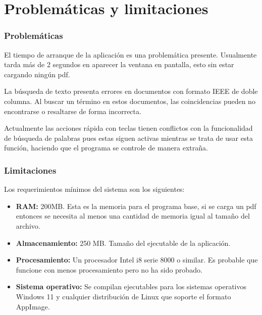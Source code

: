 \section{Problemáticas y limitaciones}

\subsubsection{Problemáticas}

El tiempo de arranque de la aplicación es una problemática presente. Usualmente tarda más de 2 segundos en aparecer la ventana en pantalla, esto sin estar cargando ningún pdf.

La búsqueda de texto presenta errores en documentos con formato IEEE de doble columna. Al buscar un término en estos documentos, las coincidencias pueden no encontrarse o resaltarse de forma incorrecta.

Actualmente las acciones rápida con teclas tienen conflictos con la funcionalidad de búsqueda de palabras pues estas siguen activas mientras se trata de usar esta función, haciendo que el programa se controle de manera extraña.

\subsubsection{Limitaciones}



Los requerimientos mínimos del sistema son los siguientes:
\begin{itemize}
	\item \textbf{RAM: }200MB. Esta es la memoria para el programa base, si se carga un pdf entonces se necesita al menos una cantidad de memoria igual al tamaño del archivo.
	\item \textbf{Almacenamiento:} 250 MB. Tamaño del ejecutable de la aplicación.
	\item \textbf{Procesamiento:} Un procesador Intel i8 serie 8000 o similar. Es probable que funcione con menos procesamiento pero no ha sido probado.
	\item \textbf{Sistema operativo:} Se compilan ejecutables para los sistemas operativos Windows 11 y cualquier distribución de Linux que soporte el formato AppImage.
\end{itemize}


